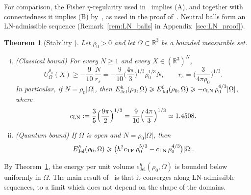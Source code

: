 \documentclass[final,reqno]{amsart}
\newtheorem{theorem}{Theorem}[section]
\theoremstyle{remark}
\theoremstyle{definition}
\renewcommand{\ge}{\geqslant}
\newcommand{\RR}{\mathbb{R}}
\newcommand{\TF}{\mathrm{TF}}
\newcommand{\Jel}{\mathrm{Jel}}
\begin{document}
For comparison, the Fisher $\eta$-regularity used in~\cite{lewin2018statistical} implies (A), and together with connectedness it implies (B) by~\cite[Sec.~V and Appendix~A]{lieb1972constitution}, as used in the proof of~\cite[Thm.~2.6]{lewin2018statistical}. Neutral balls form an LN-admissible sequence (Remark~\ref{rem:LN_balls} in Appendix~\ref{sec:LN_proof}).

\begin{theorem}[Stability {\cite[Appendix]{lieb1975thermodynamic}}]\label{thm:LN_stability}
Let $\rho_0>0$ and let $\Omega\subset\RR^3$ be a bounded measurable set.
\begin{enumerate}[(i)]
\item (Classical bound) For every $N\ge1$ and every $X\in(\RR^3)^N$,
\begin{equation}\label{eq:LN_Onsager}
U^{\rho_0}_\Omega(X)\ge-\frac{9}{10}\,\frac{N}{r_s}=-\frac{9}{10}\Big(\frac{4\pi}{3}\Big)^{1/3}\rho_0^{1/3}N,\qquad r_s=\Big(\frac{3}{4\pi\rho_0}\Big)^{1/3}.
\end{equation}
In particular, if $N=\rho_0|\Omega|$, then $E^\hbar_\Jel(\rho_0,\Omega)\ge E^0_\Jel(\rho_0,\Omega)\ge-c_{\rm LN}\,\rho_0^{4/3}|\Omega|$, where
\[
c_{\rm LN}:=\frac35\Big(\frac{9\pi}{2}\Big)^{1/3}=\frac{9}{10}\Big(\frac{4\pi}{3}\Big)^{1/3}\simeq1.4508.
\]
\item (Quantum bound) If $\Omega$ is open and $N=\rho_0|\Omega|$, then
\begin{equation}\label{eq:LN_quantum_stability}
E^\hbar_\Jel(\rho_0,\Omega)\ge\big(\hbar^2c_\TF\,\rho_0^{5/3}-c_{\rm LN}\,\rho_0^{4/3}\big)|\Omega|.
\end{equation}
\end{enumerate}
\end{theorem}

By Theorem~\ref{thm:LN_stability}, the energy per unit volume $e^\hbar_\Jel(\rho_0,\Omega)$ is bounded below uniformly in $\Omega$. The main result of~\cite{lieb1975thermodynamic} is that it converges along LN-admissible sequences, to a limit which does not depend on the shape of the domains.
\end{document}
